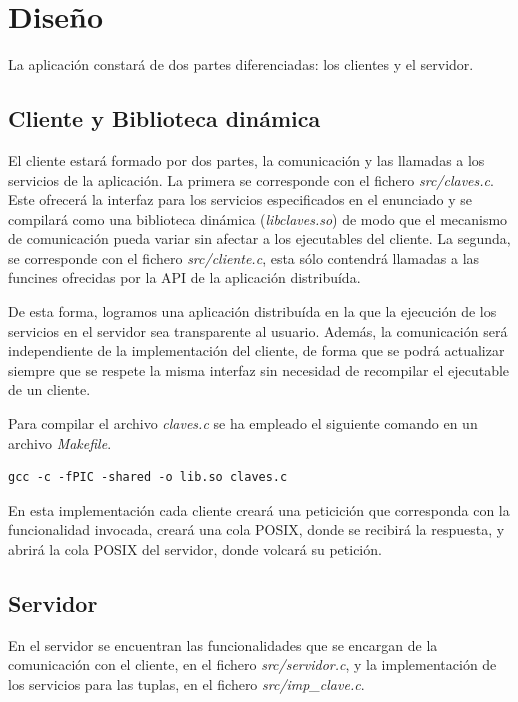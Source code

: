 \documentclass[]{article}
\begin{document}
\section{Diseño}
\label{sec:disenno}
La aplicación constará de dos partes diferenciadas: los clientes y el servidor.

\subsection{Cliente y Biblioteca dinámica}
\label{subsec:cliente_biblioteca}
El cliente estará formado por dos partes, la comunicación y las llamadas a los servicios de la aplicación. La primera se corresponde con el fichero \textit{src/claves.c}. Este ofrecerá la interfaz para los servicios especificados en el enunciado y se compilará como una biblioteca dinámica (\textit{libclaves.so}) de modo que el mecanismo de comunicación pueda variar sin afectar a los ejecutables del cliente. La segunda, se corresponde con el fichero \textit{src/cliente.c}, esta sólo contendrá llamadas a las funcines ofrecidas por la API de la aplicación distribuída.  

De esta forma, logramos una aplicación distribuída en la que la ejecución de los servicios en el servidor sea transparente al usuario. Además, la comunicación será independiente de la implementación del cliente, de forma que se podrá actualizar siempre que se respete la misma interfaz sin necesidad de recompilar el ejecutable de un cliente.

Para compilar el archivo \textit{claves.c} se ha empleado el siguiente comando en un archivo \textit{Makefile}.

\begin{center}
\begin{lstlisting}[caption=Compiación de biblioteca dinámica]
gcc -c -fPIC -shared -o lib.so claves.c
\end{lstlisting}
\end{center}

En esta implementación cada cliente creará una peticición que corresponda con la funcionalidad invocada, creará una cola POSIX, donde se recibirá la respuesta, y abrirá la cola POSIX del servidor, donde volcará su petición.

\subsection{Servidor}
\label{subsec:servidor}
En el servidor se encuentran las funcionalidades que se encargan de la comunicación con el cliente, en el fichero \textit{src/servidor.c}, y la implementación de los servicios para las tuplas, en el fichero \textit{src/imp\_clave.c}.
\end{document}
